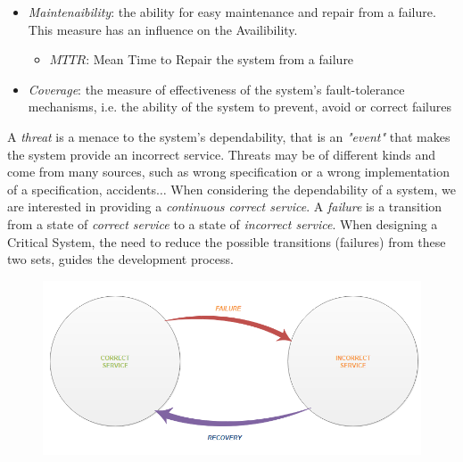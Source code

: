 \begin{itemize}
	\item \textsl{Maintenaibility}: the ability for easy maintenance and repair from a failure. This measure has an influence on the Availibility.
	\begin{itemize}
		\item[] $MTTR$: Mean Time to Repair the system from a failure
	\end{itemize}
\end{itemize}

\begin{itemize}
	\item \textsl{Coverage}: the measure of effectiveness of the system's fault-tolerance mechanisms, i.e. the ability of the system to prevent, avoid or correct failures
\end{itemize}

\newpage

A \textsl{threat} is a menace to the system's dependability, that is an \textsl{"event"} that makes the system provide an incorrect service. Threats may be of different kinds and come from many sources, such as wrong specification or a wrong implementation of a specification, accidents$\dots$
When considering the dependability of a system, we are interested in providing a \textsl{continuous correct service}. A \textsl{failure} is a transition from a state of \textsl{correct service} to a state of \textsl{incorrect service}.
When designing a Critical System, the need to reduce the possible transitions (failures) from these two sets, guides the development process.

\begin{figure}[h!]
	\includegraphics[width=\textwidth]{img/correct-incorrect.png}
	\caption{}
\end{figure}

